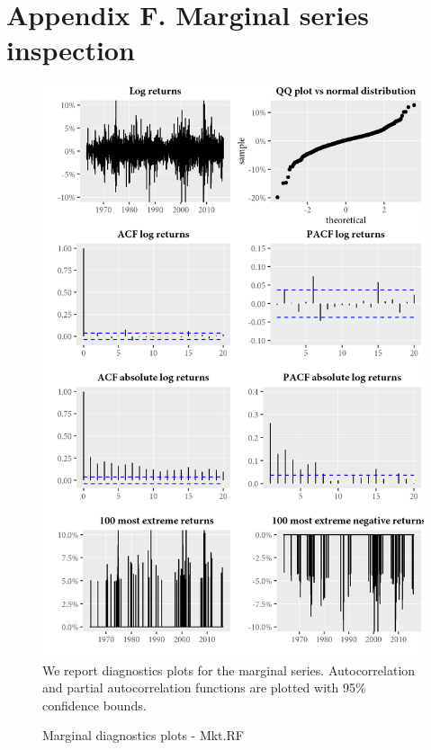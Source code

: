\section{Appendix F. Marginal series inspection}
\label{App:AppendixF}
\begin{figure}[H]
  \caption{Marginal diagnostics plots - Mkt.RF}
  \label{diag:marginaldiagMkt.RF}
  \centering
  \begin{minipage}{\textwidth}
  \includegraphics[scale=1]{graphics/marginal/MarginalStats.Mkt.RF.Estim.png}  
  \vspace{3mm}
  \footnotesize
  We report diagnostics plots for the marginal series. Autocorrelation and partial autocorrelation functions are plotted with 95\% confidence bounds. 
  \end{minipage}
\end{figure}
